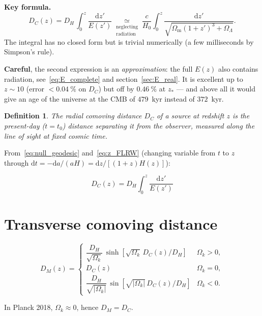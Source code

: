 \documentclass[11pt,a4paper,openany]{report}
\newcommand{\Hzero}{H_{0}}
\newcommand{\Om}{\Omega_{\mathrm{m}}}
\newcommand{\OL}{\Omega_{\Lambda}}
\newcommand{\Ok}{\Omega_{k}}
\newcommand{\dif}{\mathrm{d}}
\newtheorem{definition}[theorem]{Definition}
\begin{document}
\begin{tcolorbox}[undergrad]
\textbf{Key formula.}
\[
D_{C}(z) = D_{H}\,\int_{0}^{z}\frac{\dif z'}{E(z')}
         \underset{\substack{\text{neglecting}\\\text{radiation}}}{\simeq}
           \frac{c}{\Hzero}\int_{0}^{z}\frac{\dif z'}{\sqrt{\Om(1+z')^{3} + \OL}}.
\]
The integral has no closed form but is trivial numerically (a few milliseconds
by Simpson's rule).

\medskip
\textbf{Careful}, the second expression is an \emph{approximation}: the full
$E(z)$ also contains radiation, see~\eqref{eq:E_complete} and
section~\ref{sec:E_real}. It is excellent up to $z\sim 10$ (error $< 0.04~\%$
on $D_{C}$) but off by $0.46~\%$ at $z_{*}$ --- and above all it would give an
age of the universe at the CMB of $479$~kyr instead of $372$~kyr.
\end{tcolorbox}

\begin{definition}
The \emph{radial comoving distance} $D_{C}$ of a source at redshift $z$ is the
\emph{present-day} ($t=t_0$) distance separating it from the observer, measured
along the line of sight at fixed cosmic time.
\end{definition}

From~\eqref{eq:null_geodesic} and~\eqref{eq:z_FLRW} (changing variable from $t$
to $z$ through $\dif t = -\dif a/(aH) = \dif z / [(1+z)H(z)]$):

\begin{equation}
\boxed{\;D_{C}(z) = D_{H}\int_{0}^{z}\frac{\dif z'}{E(z')}\;}
\label{eq:DC}
\end{equation}

\section{Transverse comoving distance}
\label{sec:DM}

\begin{equation}
D_{M}(z) =
\begin{cases}
\dfrac{D_{H}}{\sqrt{\Ok}}\,\sinh\!\left[\sqrt{\Ok}\,D_{C}(z)/D_{H}\right] & \Ok>0,\\[6pt]
D_{C}(z) & \Ok=0,\\[6pt]
\dfrac{D_{H}}{\sqrt{|\Ok|}}\,\sin\!\left[\sqrt{|\Ok|}\,D_{C}(z)/D_{H}\right] & \Ok<0.
\end{cases}
\label{eq:DM}
\end{equation}

\noindent In Planck 2018, $\Ok \approx 0$, hence $D_{M} = D_{C}$.
\end{document}

